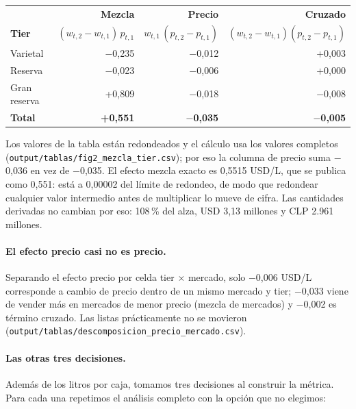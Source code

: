 \begin{center}
\small
\begin{tabular}{l r r r}
\hline
& \textbf{Mezcla} & \textbf{Precio} & \textbf{Cruzado} \\
\textbf{Tier} & $(w_{t,2} - w_{t,1})\, p_{t,1}$ & $w_{t,1}\,(p_{t,2} - p_{t,1})$ & $(w_{t,2} - w_{t,1})(p_{t,2} - p_{t,1})$ \\
\hline
Varietal     & $-$0,235 & $-$0,012 & +0,003 \\
Reserva      & $-$0,023 & $-$0,006 & +0,000 \\
Gran reserva & +0,809   & $-$0,018 & $-$0,008 \\
\hline
\textbf{Total} & \textbf{+0,551} & \textbf{$-$0,035} & \textbf{$-$0,005} \\
\hline
\end{tabular}
\end{center}

\noindent Los valores de la tabla están redondeados y el cálculo usa los valores completos (\texttt{output/tablas/fig2\_mezcla\_tier.csv}); por eso la columna de precio suma $-$0,036 en vez de $-$0,035. El efecto mezcla exacto es 0,5515 USD/L, que se publica como 0,551: está a 0,00002 del límite de redondeo, de modo que redondear cualquier valor intermedio antes de multiplicar lo mueve de cifra. Las cantidades derivadas no cambian por eso: 108\,\% del alza, USD 3,13 millones y CLP 2.961 millones.

\paragraph{El efecto precio casi no es precio.} Separando el efecto precio por celda tier $\times$ mercado, solo $-$0,006 USD/L corresponde a cambio de precio dentro de un mismo mercado y tier; $-$0,033 viene de vender más en mercados de menor precio (mezcla de mercados) y $-$0,002 es término cruzado. Las listas prácticamente no se movieron (\texttt{output/tablas/descomposicion\_precio\_mercado.csv}).

\paragraph{Las otras tres decisiones.} Además de los litros por caja, tomamos tres decisiones al construir la métrica. Para cada una repetimos el análisis completo con la opción que no elegimos:

